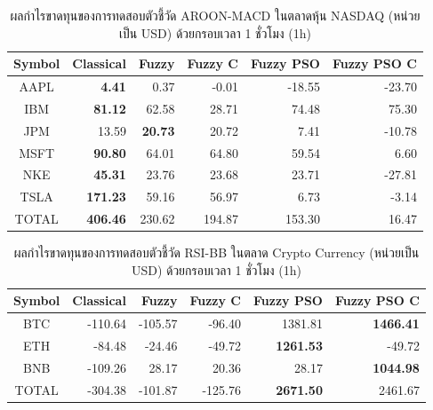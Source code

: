\begin{table}[!htb]
    \centering
    \begin{tabular}{crrrrr}
        \hline
        \textbf{Symbol} & \textbf{Classical} & \textbf{Fuzzy} & \textbf{Fuzzy C} & \textbf{Fuzzy PSO} & \textbf{Fuzzy PSO C} \\ \hline
        AAPL            & \textbf{4.41}      & 0.37           & -0.01            & -18.55             & -23.70               \\ \hline
        IBM             & \textbf{81.12}     & 62.58          & 28.71            & 74.48              & 75.30                \\ \hline
        JPM             & 13.59              & \textbf{20.73} & 20.72            & 7.41               & -10.78               \\ \hline
        MSFT            & \textbf{90.80}     & 64.01          & 64.80            & 59.54              & 6.60                 \\ \hline
        NKE             & \textbf{45.31}     & 23.76          & 23.68            & 23.71              & -27.81               \\ \hline
        TSLA            & \textbf{171.23}    & 59.16          & 56.97            & 6.73               & -3.14                \\ \hline
        TOTAL           & \textbf{406.46}    & 230.62         & 194.87           & 153.30             & 16.47                \\ \hline
    \end{tabular}
    \caption{ผลกำไรขาดทุนของการทดสอบตัวชี้วัด AROON-MACD ในตลาดหุ้น NASDAQ (หน่วยเป็น USD) ด้วยกรอบเวลา 1 ชั่วโมง (1h)}
    \label{tab:aroon-macd-stocks}
\end{table}
\FloatBarrier
\pagebreak

\begin{table}[!htb]
    \centering
    \begin{tabular}{crrrrr}
        \hline
        \textbf{Symbol} & \textbf{Classical} & \textbf{Fuzzy} & \textbf{Fuzzy C} & \textbf{Fuzzy PSO} & \textbf{Fuzzy PSO C} \\ \hline
        BTC             & -110.64            & -105.57        & -96.40           & 1381.81            & \textbf{1466.41}     \\ \hline
        ETH             & -84.48             & -24.46         & -49.72           & \textbf{1261.53}   & -49.72               \\ \hline
        BNB             & -109.26            & 28.17          & 20.36            & 28.17              & \textbf{1044.98}     \\ \hline
        TOTAL           & -304.38            & -101.87        & -125.76          & \textbf{2671.50}   & 2461.67              \\ \hline
    \end{tabular}
    \caption{ผลกำไรขาดทุนของการทดสอบตัวชี้วัด RSI-BB ในตลาด Crypto Currency (หน่วยเป็น USD) ด้วยกรอบเวลา 1 ชั่วโมง (1h)}
    \label{tab:rsi-bb-crypto}
\end{table}

